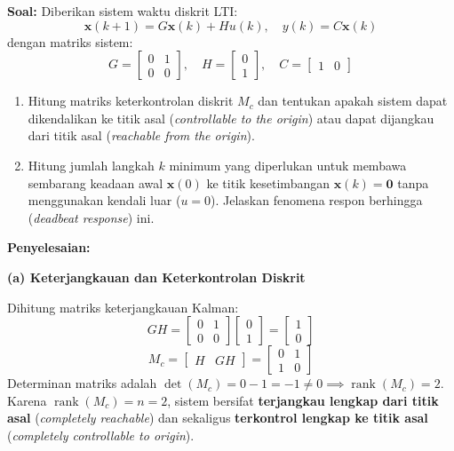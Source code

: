 \documentclass[11pt,a4paper]{article}
\begin{document}
\textbf{Soal:}  
Diberikan sistem waktu diskrit LTI:
$$\mathbf{x}(k+1) = G \mathbf{x}(k) + H u(k), \quad y(k) = C \mathbf{x}(k)$$
dengan matriks sistem:
$$G = \begin{bmatrix} 0 & 1 \\ 0 & 0 \end{bmatrix}, \quad H = \begin{bmatrix} 0 \\ 1 \end{bmatrix}, \quad C = \begin{bmatrix} 1 & 0 \end{bmatrix}$$
\begin{enumerate}[label=(\alph*)]
    \item Hitung matriks keterkontrolan diskrit $M_c$ dan tentukan apakah sistem dapat dikendalikan ke titik asal (\textit{controllable to the origin}) atau dapat dijangkau dari titik asal (\textit{reachable from the origin}).
    \item Hitung jumlah langkah $k$ minimum yang diperlukan untuk membawa sembarang keadaan awal $\mathbf{x}(0)$ ke titik kesetimbangan $\mathbf{x}(k) = \mathbf{0}$ tanpa menggunakan kendali luar ($u = 0$). Jelaskan fenomena respon berhingga (\textit{deadbeat response}) ini.
\end{enumerate}

\textbf{Penyelesaian:}

\textbf{(a) Keterjangkauan dan Keterkontrolan Diskrit}

Dihitung matriks keterjangkauan Kalman:
$$GH = \begin{bmatrix} 0 & 1 \\ 0 & 0 \end{bmatrix} \begin{bmatrix} 0 \\ 1 \end{bmatrix} = \begin{bmatrix} 1 \\ 0 \end{bmatrix}$$
$$M_c = \begin{bmatrix} H & GH \end{bmatrix} = \begin{bmatrix} 0 & 1 \\ 1 & 0 \end{bmatrix}$$
Determinan matriks adalah $\det(M_c) = 0 - 1 = -1 \ne 0 \implies \operatorname{rank}(M_c) = 2$.
Karena $\operatorname{rank}(M_c) = n = 2$, sistem bersifat \textbf{terjangkau lengkap dari titik asal} (\textit{completely reachable}) dan sekaligus \textbf{terkontrol lengkap ke titik asal} (\textit{completely controllable to origin}).
\end{document}
